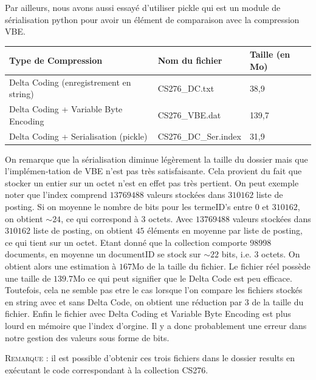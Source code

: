 \documentclass[12pt,a4paper]{article}
\begin{document}
Par ailleurs, nous avons aussi essayé d'utiliser pickle qui est un module de sérialisation python pour avoir un élément de comparaison avec la compression VBE.

\begin{table}[h]
\centering
\begin{tabular}{|l|l|l|}
\hline
Type de Compression                                   & Nom du fichier       & Taille (en Mo) \\ \hline
Delta Coding (enregistrement en string) & CS276\_DC.txt        & 38,9           \\ \hline
Delta Coding + Variable Byte Encoding                 & CS276\_VBE.dat       & 139,7          \\ \hline
Delta Coding + Serialisation (pickle)                 & CS276\_DC\_Ser.index & 31,9           \\ \hline
\end{tabular}
\end{table}

On remarque que la sérialisation diminue légèrement la taille du dossier mais que l'implémen-tation de VBE n'est pas très satisfaisante. Cela provient du fait que stocker un entier sur un octet n'est en effet pas très pertient. On peut exemple noter que l'index comprend $13769488$ valeurs stockées dans $310162$ liste de posting. Si on moyenne le nombre de bits pour les termeID's entre $0$ et $310162$, on obtient $\sim24$, ce qui correspond à $3$ octets. Avec $13769488$ valeurs stockées dans $310162$ liste de posting, on obtient $45$ éléments en moyenne par liste de posting, ce qui tient sur un octet. Etant donné que la collection comporte $98998$ documents, en moyenne un documentID se stock sur $\sim22$ bits, i.e. $3$ octets. On obtient alors une estimation à $167$Mo de la taille du fichier. Le fichier réel possède une taille de $139.7$Mo ce qui peut signifier que le Delta Code est peu efficace. Toutefois, cela ne semble pas etre le cas lorsque l'on compare les fichiers stockés en string avec et sans Delta Code, on obtient une réduction par $3$ de la taille du fichier. Enfin le fichier avec Delta Coding et Variable Byte Encoding est plus lourd en mémoire que l'index d'orgine. Il y a donc probablement une erreur dans notre gestion des valeurs sous forme de bits.

\noindent \textsc{Remarque} : il est possible d'obtenir ces trois fichiers dans le dossier results en exécutant le code correspondant à la collection CS276.
\end{document}
